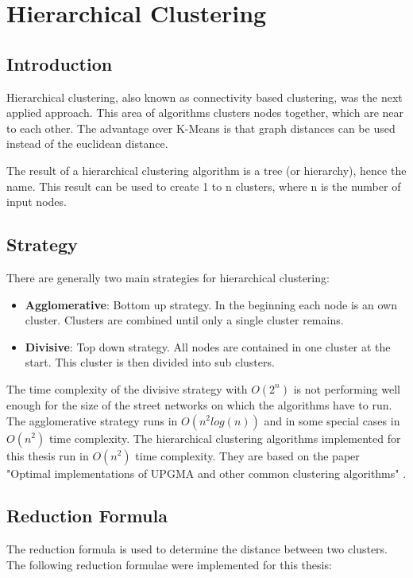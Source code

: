 \section{Hierarchical Clustering} \label{sec:hierarchicalClustering}
\subsection{Introduction}
Hierarchical clustering, also known as connectivity based clustering, was the next applied approach. This area of algorithms clusters nodes together, which are near to each other. The advantage over K-Means is that graph distances can be used instead of the euclidean distance.

The result of a hierarchical clustering algorithm is a tree (or hierarchy), hence the name. This result can be used to create 1 to n clusters, where n is the number of input nodes.

\subsection{Strategy}
There are generally two main strategies for hierarchical clustering:

\begin{itemize}
    \item \textbf{Agglomerative}: Bottom up strategy. In the beginning each node is an own cluster. Clusters are combined until only a single cluster remains.
    \item \textbf{Divisive}: Top down strategy. All nodes are contained in one cluster at the start. This cluster is then divided into sub clusters.
\end{itemize}

The time complexity of the divisive strategy with $O(2^n)$ is not performing well enough for the size of the street networks on which the algorithms have to run. The agglomerative strategy runs in $O(n^2 log(n))$ and in some special cases in $O(n^2)$ time complexity. The hierarchical clustering algorithms implemented for this thesis run in $O(n^2)$ time complexity. They are based on the paper "Optimal implementations of UPGMA and other common clustering algorithms" \cite{clustering:2007}.

\subsection{Reduction Formula}
The reduction formula is used to determine the distance between two clusters.
The following reduction formulae were implemented for this thesis:

